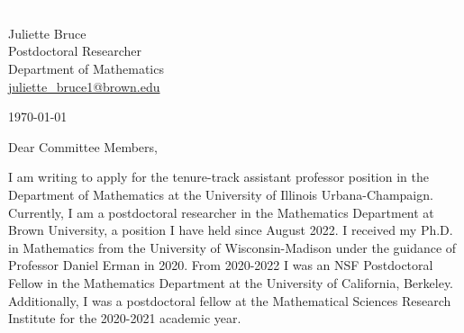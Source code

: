 \documentclass[11pt]{article}
\begin{document}
\section*{}

\noindent
\begin{minipage}{0.99\textwidth}
\begin{minipage}{0.69\textwidth}
\textcolor{white}{.}
\end{minipage}
\begin{minipage}{0.29\textwidth}
{
Juliette Bruce \\
Postdoctoral Researcher \\
Department of Mathematics \\
\href{mailto:juliette\_bruce1@brown.edu}{juliette\_bruce1@brown.edu}
}

\vspace{12pt}
\today
\end{minipage}
\end{minipage}


\vspace{12pt}
\noindent
Dear Committee Members,

I am writing to apply for the tenure-track assistant professor position in the Department of Mathematics at the University of Illinois Urbana-Champaign. Currently, I am a postdoctoral researcher in the Mathematics Department at Brown University, a position I have held since August 2022. I received my Ph.D. in Mathematics from the University of Wisconsin-Madison under the guidance of Professor Daniel Erman in 2020. From 2020-2022 I was an NSF Postdoctoral Fellow in the Mathematics Department at the University of California, Berkeley. Additionally, I was a postdoctoral fellow at the Mathematical Sciences Research Institute for the 2020-2021 academic year.
\end{document}
